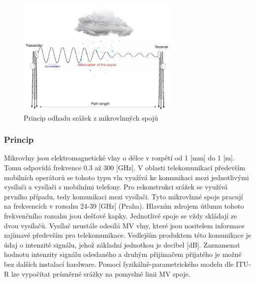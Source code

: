 \documentclass[a4paper,12pt]{report}
\begin{document}
\begin{figure}[h!]
    \centering
    \includegraphics[width=0.7\textwidth]{./img/srazky/microwave_link.png}
    \caption[MV linky]{\centering  Princip odhadu srážek z mikrovlnných spojů }
 \end{figure}   

    
\subsubsection{Princip}
Mikrovlny jsou elektromagnetické vlny o délce v rozpětí od 1 [mm] do 1 [m]. Tomu odpovídá frekvence 0.3  až 300 [GHz]. V oblasti telekomunikací především mobilních operátorů se tohoto typu vln využívá ke komunikaci mezi jednotlivými vysílači a vysílači s mobilními telefony. Pro rekonstrukci srážek se využívá prvního případu, tedy komunikaci mezi vysílači. Tyto mikrovlnné spoje pracují na frekvencích v rozsahu 24-39 [GHz] (Praha). Hlavním zdrojem útlumu tohoto frekvenčního rozsahu jsou dešťové kapky. Jednotlivé spoje se vždy skládají ze dvou vysílačů. Vysílač neustále odesílá MV vlny, které jsou nositelem informace zajímavé především pro telekomunikace. Vedlejším produktem této komunikace je údaj o intenzitě signálu, jehož základní jednotkou je decibel [dB]. Zaznamenat hodnotu intenzity signálu odeslaného a druhým přijímačem přijatého je možné bez dalších instalací hardware. Pomocí fyzikálně-parametrického modelu dle ITU-R\cite{itu} lze vypočítat průměrné srážky na pomyslné linii MV spoje.
\end{document}
